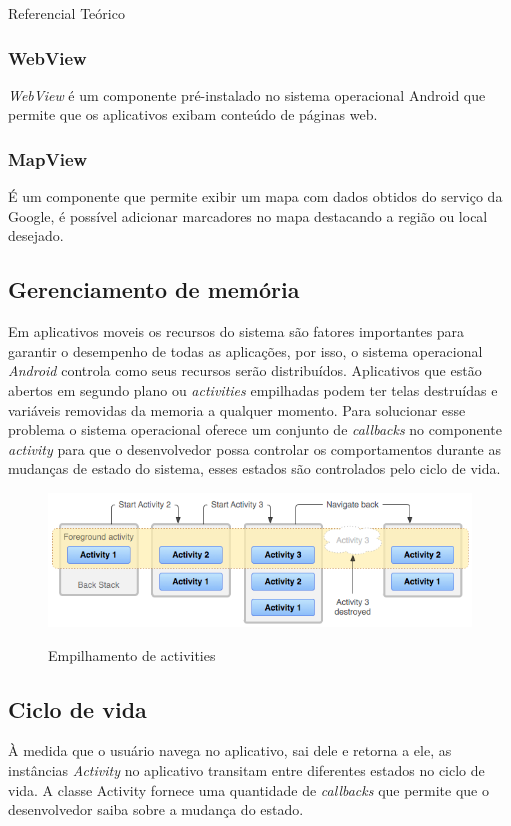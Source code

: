 \documentclass[
	12pt,				%
	openright,			%
	twoside,			%
	a4paper,			%
	english,			%
	french,				%
	spanish,			%
	brazil				%
	]{abntex2}
\begin{document}
\begin{chapter}{Referencial Teórico}
\subsubsection{WebView} \label{WebView}
\textit{WebView} é um componente pré-instalado no sistema operacional Android que permite que os aplicativos exibam conteúdo de páginas web.

\subsubsection{MapView} \label{MapView}
É um componente que permite exibir um mapa com dados obtidos do serviço da Google, é possível adicionar marcadores no mapa destacando a região ou local desejado.


\newpage
\subsection{Gerenciamento de memória}
Em aplicativos moveis os recursos do sistema são fatores importantes para garantir o desempenho de todas as aplicações, por isso, o sistema operacional \textit{Android} controla como seus recursos serão distribuídos. Aplicativos que estão abertos em segundo plano ou \textit{activities} empilhadas podem ter telas destruídas e variáveis removidas da memoria a qualquer momento. Para solucionar esse problema o sistema operacional oferece um conjunto de \textit{callbacks} no componente \textit{activity} para que o desenvolvedor possa controlar os comportamentos durante as mudanças de estado do sistema, esses estados são controlados pelo ciclo de vida.

\begin{figure}[h]
\centering
   \caption{Empilhamento de activities}
   \includegraphics[scale=0.70]{media/diagram_backstack.png}
     \label{fig:backstack}
\end{figure}

\subsection{Ciclo de vida}
À medida que o usuário navega no aplicativo, sai dele e retorna a ele, as instâncias \textit{Activity} no aplicativo transitam entre diferentes estados no ciclo de vida. A classe Activity fornece uma quantidade de \textit{callbacks} que permite que o desenvolvedor saiba sobre a mudança do estado.


\end{chapter}
\end{document}

